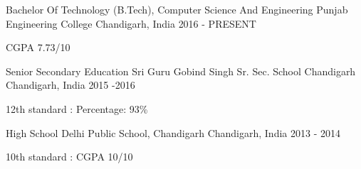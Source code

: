 \begin{cventries}
  \cventry
    {Bachelor Of Technology (B.Tech), Computer Science And Engineering}
    {Punjab Engineering College}
    {Chandigarh, India}
    {2016 - PRESENT}
    {
      \begin{cvitems}
        \item {CGPA 7.73/10}
      \end{cvitems}
    }
     \cventry
    {Senior Secondary Education}
    {Sri Guru Gobind Singh Sr. Sec. School Chandigarh }
    {Chandigarh, India}
    {2015 -2016 }
    {
      \begin{cvitems}
        \item {12th standard : Percentage: 93\%}
      \end{cvitems}
    }
    \cventry
    {High School}
    {Delhi Public School, Chandigarh}
    {Chandigarh, India}
    {2013 - 2014}
    {
      \begin{cvitems}
        \item {10th standard : CGPA 10/10}
      \end{cvitems}
    }
\end{cventries}

